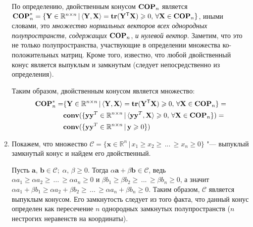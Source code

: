 \documentclass[a4paper,12pt]{article}
\begin{document}
\begin{enumerate}
		 По определению, двойственным конусом  $\text{\textbf{COP}}_n$  является $\text{\textbf{COP}}_n^* = \{ \mathbf{Y} \in \mathbb{R}^{n\times n} \,|\, \langle\mathbf{Y}, \mathbf{X}\rangle = \textbf{tr}(\mathbf{Y}^\mathsf{T}\mathbf{X})\geqslant0,\, \forall \mathbf{X} \in \text{\textbf{COP}}_n \}$, иными словами, это \textit{множество нормальных векторов всех однородных полупространств, содержащих} $\text{\textbf{COP}}_n$, \textit{и нулевой вектор}. Заметим, что это не только полупространства, участвующие в определении множества ко-положительных матриц. Кроме того, известно, что любой двойственный конус является выпуклым и замкнутым (следует непосредственно из определения).
		 
		 Таким образом, двойственным конусом является множество:
		 \begin{equation*}
		 \begin{aligned}
		 \text{\textbf{COP}}_n^* = &\{ \mathbf{Y} \in \mathbb{R}^{n\times n} \,|\, \langle\mathbf{Y}, \mathbf{X}\rangle =
		 \textbf{tr}(\mathbf{Y}^\mathsf{T}\mathbf{X})\geqslant0,\, \forall \mathbf{X} \in \text{\textbf{COP}}_n \} = \\
		 &\textbf{conv}(\{ \mathbf{y} \mathbf{y}^T \in \mathbb{R}^{n\times n} \,|\, \langle\mathbf{y} \mathbf{y}^T, \mathbf{X}\rangle \geqslant 0,\, \forall \mathbf{X} \in \textbf{COP}_n\})  = \\
		 &\textbf{conv}(\{\mathbf{y} \mathbf{y}^T \in \mathbb{R}^{n\times n} \,|\, \mathbf{y} \geqslant 0\})
		 \end{aligned}
		 \end{equation*}
		
		\item
		
		Покажем, что множество $\mathcal{C} = \{ \mathbf{x} \in \mathbb{R}^n \,|\, x_1 \geqslant x_2 \geqslant\, ... \, \geqslant x_n \geqslant 0 \}$ "--- выпуклый замкнутый конус и найдем его двойственный.
		
		Пусть $\mathbf{a},\,\mathbf{b} \in \mathcal{C};\; \alpha,\,\beta \geqslant 0$. Тогда $\alpha \mathbf{a} + \beta \mathbf{b} \in \mathcal{C}$, ведь $ \alpha a_1 \geqslant \alpha a_2 \geqslant\, ... \, \geqslant \alpha a_n \geqslant 0$ и $ \beta b_1 \geqslant \beta b_2 \geqslant\, ... \, \geqslant  \beta b_n \geqslant 0$,  а значит $ \alpha a_1 + \beta b_1 \geqslant \alpha a_2 + \beta b_2 \geqslant\, ... \, \geqslant \alpha a_n + \beta b_n \geqslant 0$. Таким образом, $\mathcal{C} $ является выпуклым конусом. Его замкнутость следует из того факта, что данный конус определен как пересечение $n$ однородных замкнутых полупространств ($n$ нестрогих неравенств на координаты).
		

\end{enumerate}
\end{document}
